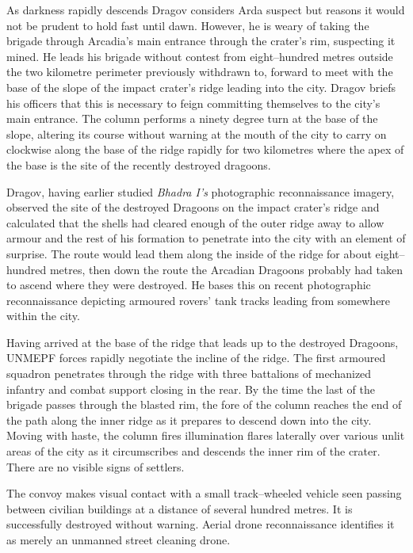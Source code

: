 As darkness rapidly descends Dragov considers Arda suspect but reasons it would not be prudent to hold fast until dawn. However, he is weary of taking the brigade through Arcadia's main entrance through the crater's rim, suspecting it mined. He leads his brigade without contest from eight--hundred metres outside the two kilometre perimeter previously withdrawn to, forward to meet with the base of the slope of the impact crater's ridge leading into the city. Dragov briefs his officers that this is necessary to feign committing themselves to the city's main entrance. The column performs a ninety degree turn at the base of the slope, altering its course without warning at the mouth of the city to carry on clockwise along the base of the ridge rapidly for two kilometres where the apex of the base is the site of the recently destroyed dragoons.

Dragov, having earlier studied {\it Bhadra I's} photographic reconnaissance imagery, observed the site of the destroyed Dragoons on the impact crater's ridge and calculated that the shells had cleared enough of the outer ridge away to allow armour and the rest of his formation to penetrate into the city with an element of surprise. The route would lead them along the inside of the ridge for about eight--hundred metres, then down the route the Arcadian Dragoons probably had taken to ascend where they were destroyed. He bases this on recent photographic reconnaissance depicting armoured rovers' tank tracks leading from somewhere within the city.

Having arrived at the base of the ridge that leads up to the destroyed Dragoons, UNMEPF forces rapidly negotiate the incline of the ridge. The first armoured squadron penetrates through the ridge with three battalions of mechanized infantry and combat support closing in the rear. By the time the last of the brigade passes through the blasted rim, the fore of the column reaches the end of the path along the inner ridge as it prepares to descend down into the city. Moving with haste, the column fires illumination flares laterally over various unlit areas of the city as it circumscribes and descends the inner rim of the crater. There are no visible signs of settlers.

The convoy makes visual contact with a small track--wheeled vehicle seen passing between civilian buildings at a distance of several hundred metres. It is successfully destroyed without warning. Aerial drone reconnaissance identifies it as merely an unmanned street cleaning drone.

